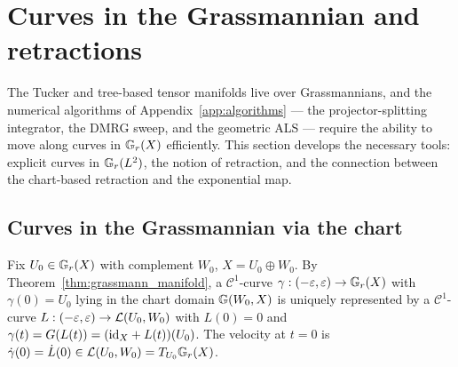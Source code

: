 \section{Curves in the Grassmannian and retractions}
\label{sec:banach:retractions}

The Tucker and tree-based tensor manifolds live over Grassmannians, and
the numerical algorithms of Appendix~\ref{app:algorithms} — the
projector-splitting integrator, the DMRG sweep, and the geometric
ALS — require the ability to move along curves in $\mathbb{G}_{r}(X)$
efficiently. This section develops the necessary tools: explicit
curves in $\mathbb{G}_{r}(L^2)$, the notion of retraction, and the
connection between the chart-based retraction and the exponential map.

\subsection*{Curves in the Grassmannian via the chart}

Fix $U_0 \in \mathbb{G}_{r}(X)$ with complement $W_0$, $X = U_0 \oplus W_0$.
By Theorem~\ref{thm:grassmann_manifold}, a $\mathcal{C}^1$-curve
$\gamma: (-\varepsilon, \varepsilon) \to \mathbb{G}_{r}(X)$ with
$\gamma(0) = U_0$ lying in the chart domain $\mathbb{G}(W_0, X)$ is
uniquely represented by a $\mathcal{C}^1$-curve
$L: (-\varepsilon, \varepsilon) \to \mathcal{L}(U_0, W_0)$ with $L(0) = 0$
and $\gamma(t) = G(L(t)) = (\mathrm{id}_{X} + L(t))(U_0)$.
The velocity at $t=0$ is $\dot\gamma(0) = \dot L(0) \in \mathcal{L}(U_0, W_0)
= T_{U_0}\mathbb{G}_{r}(X)$.


